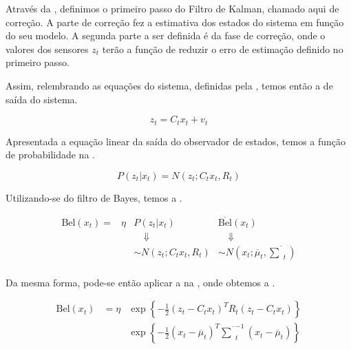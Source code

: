Através da , definimos o primeiro passo do Filtro de Kalman, chamado aqui de correção. A parte de correção fez a estimativa dos estados do sistema em função do seu modelo.
A segunda parte a ser definida é da fase de correção, onde o valores dos sensores $z_t$ terão a função de reduzir o erro de estimação definido no primeiro passo.

Assim, relembrando as equações do sistema, definidas pela , temos então a  de saída do sistema.

\begin{equation}
    z_t = C_t x_t + v_t
    \label{eq:bayes10}    
\end{equation}

Apresentada a equação linear da saída do observador de estados, temos a função de probabilidade na .

\begin{equation}
    P(z_t| x_t)= N\left(z_t; C_t x_t, R_t\right)
    \label{eq:bayes11}
\end{equation}   

Utilizando-se do filtro de Bayes, temos a .

\begin{equation}
    \label{eq:bayes12}
    \begin{matrix}
        \text{Bel}(x_t) = &  \eta & P(z_t| x_t) & \overline{\text{Bel}}(x_t) \\
        & & \quad \Downarrow & \quad\Downarrow \\
        & & \sim N\left(z_t; C_t x_t, R_t\right) & \sim N\left(x_t; \overline{\mu}_t, \overline{\textstyle\sum}_t\right) \\
    \end{matrix}
\end{equation}

Da mesma forma, pode-se então aplicar a  na , onde obtemos a .

\begin{equation}
    \label{eq:bayes13}
    \begin{matrix}
        \text{Bel}(x_t)  & = \eta & \exp\left\{  -\displaystyle\frac{1}{2} \left(z_t - C_t x_t\right)^T R_t \left(z_t - C_t x_t\right)  \right\} \\
        & & \exp\left\{ -\displaystyle\frac{1}{2} \left(x_t - \overline{\mu}_t\right)^T \overline{\textstyle\sum}_t^{-1} \left(x_t - \overline{\mu}_t\right) \right\}
    \end{matrix}
\end{equation}

